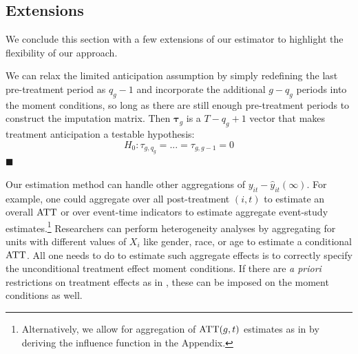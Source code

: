 \documentclass[12pt]{article}
\begin{document}
\subsection{Extensions}

We conclude this section with a few extensions of our estimator to highlight the flexibility of our approach.

\begin{remark}
We can relax the limited anticipation assumption by simply redefining the last pre-treatment period as $q_g - 1$ and incorporate the additional $g - q_g$ periods into the moment conditions, so long as there are still enough pre-treatment periods to construct the imputation matrix. Then $\bm \tau_g$ is a $T - q_g + 1$ vector that makes treatment anticipation a testable hypothesis:
\begin{equation}
H_0: \tau_{g,q_g} = ... = \tau_{g,g-1} = 0 
\end{equation}
$\blacksquare$
\end{remark} 

\begin{remark}

Our estimation method can handle other aggregations of $y_{it} - \hat{y}_{it}(\infty)$. For example, one could aggregate over all post-treatment $(i,t)$ to estimate an overall $\text{ATT}$ or over event-time indicators to estimate aggregate event-study estimates.\footnote{Alternatively, we allow for aggregation of $\text{ATT}(g,t)$ estimates as in \citet{Callaway_Santanna_2021} by deriving the influence function in the Appendix.
} Researchers can perform heterogeneity analyses by aggregating for units with different values of $X_i$ like gender, race, or age to estimate a conditional $\text{ATT}$. All one needs to do to estimate such aggregate effects is to correctly specify the unconditional treatment effect moment conditions. If there are \emph{a priori} restrictions on treatment effects as in \citet{Borusyak_Jaravel_Spiess_2021}, these can be imposed on the moment conditions as well. 
\end{remark}
\end{document}
